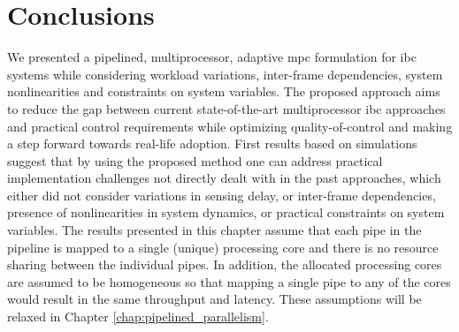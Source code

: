 \section{Conclusions}\label{sec:ch6_conclusions}
We presented a pipelined, multiprocessor, adaptive \gls{mpc} formulation for \gls{ibc} systems while considering workload variations, inter-frame dependencies, system nonlinearities and constraints on system variables.
The proposed approach aims to reduce the gap between current state-of-the-art multiprocessor \gls{ibc} approaches and practical control requirements while optimizing quality-of-control and making a step forward towards real-life adoption. 
First results based on simulations suggest that by using the proposed method one can address practical implementation challenges not directly dealt with in the past approaches, which either did not consider variations in sensing delay, or inter-frame dependencies, presence of nonlinearities in system dynamics, or practical constraints on system variables. 
The results presented in this chapter assume that each pipe in the pipeline is mapped to a single (unique) processing core and there is no resource sharing between the individual pipes.
In addition, the allocated processing cores are assumed to be homogeneous so that mapping a single pipe to any of the cores would result in the same throughput and latency.
These assumptions will be relaxed in Chapter \ref{chap:pipelined_parallelism}.